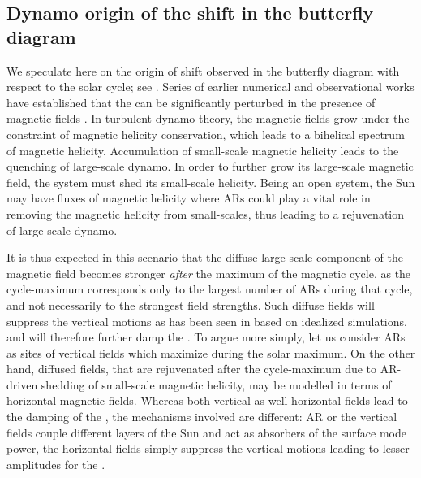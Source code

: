 \documentclass{aa}
\begin{document}
\subsection{Dynamo origin of the shift in the \fff butterfly diagram}
We speculate here on the origin of shift observed in the \fff butterfly diagram
with respect to the solar cycle; see .
Series of earlier numerical and observational works have established that the \fff can be
significantly perturbed in the presence of magnetic fields \citep{S+14,S+15,SRB16,S+20}.
In turbulent dynamo theory, the magnetic fields grow under the constraint of magnetic helicity
conservation, which leads to a bihelical spectrum of magnetic helicity. Accumulation of small-scale
magnetic helicity leads to the quenching of large-scale dynamo. In order to further grow its large-scale
magnetic field, the system must shed its small-scale helicity. Being an open system, the Sun
may have fluxes of magnetic helicity where ARs could play a vital role in removing the magnetic
helicity from small-scales, thus leading to a rejuvenation of large-scale dynamo.

It is thus expected in this scenario that the diffuse large-scale component of the magnetic field
becomes stronger \emph{after} the maximum of the magnetic cycle, as the cycle-maximum corresponds
only to the largest number of ARs during that cycle, and not necessarily to the strongest field
strengths. Such diffuse fields will suppress the vertical motions as has been seen in \citet{S+15}
based on idealized simulations, and will therefore further damp the \fff.
To argue more simply, let us consider ARs as sites of vertical fields which maximize during the
solar maximum. On the other hand, diffused fields, that are rejuvenated after the cycle-maximum due
to AR-driven shedding of small-scale magnetic helicity, may be modelled in terms of horizontal
magnetic fields. Whereas both vertical as well horizontal fields lead to the damping of the
\fff, the mechanisms involved are different: AR or the vertical fields couple different layers
of the Sun and act as absorbers of the surface mode power, the horizontal fields simply suppress the
vertical motions leading to lesser amplitudes for the \fff.
\end{document}
